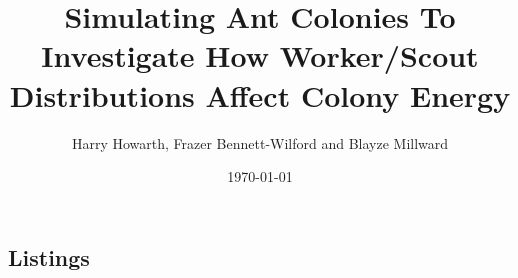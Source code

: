 \documentclass[11pt,oneside,titlepage]{article}
\begin{document}
  \title{Simulating Ant Colonies To Investigate How Worker/Scout Distributions Affect Colony Energy}
  \author{Harry Howarth, Frazer Bennett-Wilford and Blayze Millward}
  \date{\today}
  \maketitle
  
  
  
  
  
  
  
  
  
  
  
  \newpage
  
  

  \newpage
  \begin{appendix}
    \listoffigures
    \listoftables
    \section*{Listings}
  \end{appendix}
  
\end{document}
